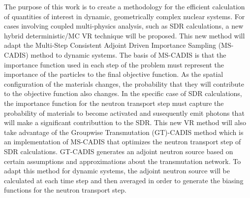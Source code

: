 The purpose of this work is to create a methodology for the efficient calculation
of quantities of
interest in dynamic, geometrically complex nuclear systems.
For cases involving coupled multi-physics analysis, such as SDR calculations,
a new hybrid deterministic/MC VR technique will be proposed.
This new method will adapt the Multi-Step Consistent Adjoint Driven Importance Sampling
(MS-CADIS) method to dynamic systems.
 The basis of MS-CADIS is that the importance function used
in each step of the problem must represent the importance of the particles to
the final objective function.  As the spatial configuration of the materials
changes, the probability that they will contribute to the objective function
also changes.
In the specific case of SDR calculations, the importance function for the neutron transport step
must capture the probability of materials to become activated and susequently emit photons that
will make a significant contributtion to the SDR.
This new VR method will also take advantage of
 the Groupwise Transmutation (GT)-CADIS method 
which is an implementation of MS-CADIS
that optimizes the neutron transport step of SDR calculations.
GT-CADIS generates an adjoint
neutron source based on certain assumptions and approximations about the
transmutation network.  To adapt this method for dynamic systems, the adjoint
neutron source will be calculated at each time step and then averaged
in order to generate the biasing functions for the neutron transport step.



